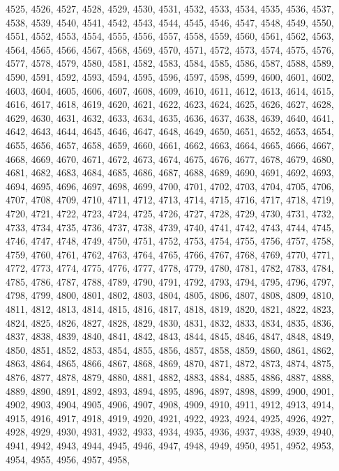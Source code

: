 4525,
4526,
4527,
4528,
4529,
4530,
4531,
4532,
4533,
4534,
4535,
4536,
4537,
4538,
4539,
4540,
4541,
4542,
4543,
4544,
4545,
4546,
4547,
4548,
4549,
4550,
4551,
4552,
4553,
4554,
4555,
4556,
4557,
4558,
4559,
4560,
4561,
4562,
4563,
4564,
4565,
4566,
4567,
4568,
4569,
4570,
4571,
4572,
4573,
4574,
4575,
4576,
4577,
4578,
4579,
4580,
4581,
4582,
4583,
4584,
4585,
4586,
4587,
4588,
4589,
4590,
4591,
4592,
4593,
4594,
4595,
4596,
4597,
4598,
4599,
4600,
4601,
4602,
4603,
4604,
4605,
4606,
4607,
4608,
4609,
4610,
4611,
4612,
4613,
4614,
4615,
4616,
4617,
4618,
4619,
4620,
4621,
4622,
4623,
4624,
4625,
4626,
4627,
4628,
4629,
4630,
4631,
4632,
4633,
4634,
4635,
4636,
4637,
4638,
4639,
4640,
4641,
4642,
4643,
4644,
4645,
4646,
4647,
4648,
4649,
4650,
4651,
4652,
4653,
4654,
4655,
4656,
4657,
4658,
4659,
4660,
4661,
4662,
4663,
4664,
4665,
4666,
4667,
4668,
4669,
4670,
4671,
4672,
4673,
4674,
4675,
4676,
4677,
4678,
4679,
4680,
4681,
4682,
4683,
4684,
4685,
4686,
4687,
4688,
4689,
4690,
4691,
4692,
4693,
4694,
4695,
4696,
4697,
4698,
4699,
4700,
4701,
4702,
4703,
4704,
4705,
4706,
4707,
4708,
4709,
4710,
4711,
4712,
4713,
4714,
4715,
4716,
4717,
4718,
4719,
4720,
4721,
4722,
4723,
4724,
4725,
4726,
4727,
4728,
4729,
4730,
4731,
4732,
4733,
4734,
4735,
4736,
4737,
4738,
4739,
4740,
4741,
4742,
4743,
4744,
4745,
4746,
4747,
4748,
4749,
4750,
4751,
4752,
4753,
4754,
4755,
4756,
4757,
4758,
4759,
4760,
4761,
4762,
4763,
4764,
4765,
4766,
4767,
4768,
4769,
4770,
4771,
4772,
4773,
4774,
4775,
4776,
4777,
4778,
4779,
4780,
4781,
4782,
4783,
4784,
4785,
4786,
4787,
4788,
4789,
4790,
4791,
4792,
4793,
4794,
4795,
4796,
4797,
4798,
4799,
4800,
4801,
4802,
4803,
4804,
4805,
4806,
4807,
4808,
4809,
4810,
4811,
4812,
4813,
4814,
4815,
4816,
4817,
4818,
4819,
4820,
4821,
4822,
4823,
4824,
4825,
4826,
4827,
4828,
4829,
4830,
4831,
4832,
4833,
4834,
4835,
4836,
4837,
4838,
4839,
4840,
4841,
4842,
4843,
4844,
4845,
4846,
4847,
4848,
4849,
4850,
4851,
4852,
4853,
4854,
4855,
4856,
4857,
4858,
4859,
4860,
4861,
4862,
4863,
4864,
4865,
4866,
4867,
4868,
4869,
4870,
4871,
4872,
4873,
4874,
4875,
4876,
4877,
4878,
4879,
4880,
4881,
4882,
4883,
4884,
4885,
4886,
4887,
4888,
4889,
4890,
4891,
4892,
4893,
4894,
4895,
4896,
4897,
4898,
4899,
4900,
4901,
4902,
4903,
4904,
4905,
4906,
4907,
4908,
4909,
4910,
4911,
4912,
4913,
4914,
4915,
4916,
4917,
4918,
4919,
4920,
4921,
4922,
4923,
4924,
4925,
4926,
4927,
4928,
4929,
4930,
4931,
4932,
4933,
4934,
4935,
4936,
4937,
4938,
4939,
4940,
4941,
4942,
4943,
4944,
4945,
4946,
4947,
4948,
4949,
4950,
4951,
4952,
4953,
4954,
4955,
4956,
4957,
4958,
